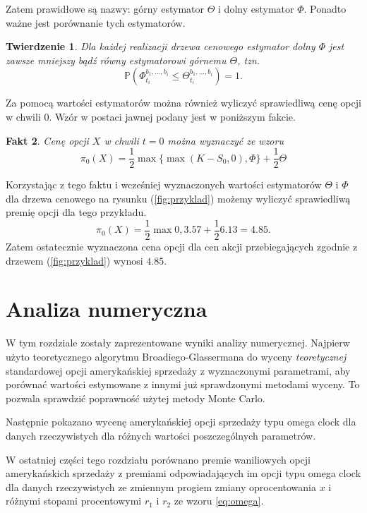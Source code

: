 \documentclass[]{pwr_wmat_praca_dyplomowa}
\theoremstyle{plain}
\newtheorem{theorem}{Twierdzenie}
\numberwithin{theorem}{chapter}
\newtheorem{fact}[theorem]{Fakt}
\theoremstyle{definition}
\numberwithin{theorem}{chapter}
\begin{document}
\noindent Zatem prawidłowe są nazwy: górny estymator $\Theta$ i dolny estymator $\Phi$. Ponadto ważne jest porównanie tych estymatorów.
\begin{theorem}
Dla każdej realizacji drzewa cenowego estymator dolny $\Phi$ jest zawsze mniejszy bądź równy estymatorowi górnemu $\Theta$, tzn.
\begin{equation*}
\mathbb{P}(\Phi_{t_i}^{b_1,\ldots,b_i}\leq \Theta_{t_i}^{b_1,\ldots,b_i}) = 1.
\end{equation*}
\end{theorem} 

\noindent Za pomocą wartości estymatorów można również wyliczyć sprawiedliwą cenę opcji w chwili $0$. Wzór w postaci jawnej podany jest w poniższym fakcie.
\begin{fact}
\label{fact}
Cenę opcji $X$ w chwili $t=0$ można wyznaczyć ze wzoru
\begin{equation*}
\pi_0(X) = \frac{1}{2}\max\{\max(K-S_0,0),\Phi\} + \frac{1}{2}\Theta
\end{equation*}
\end{fact}

\noindent Korzystając z tego faktu i wcześniej wyznaczonych wartości estymatorów $\Theta$ i $\Phi$ dla drzewa cenowego na rysunku (\ref{fig:przyklad}) możemy wyliczyć sprawiedliwą premię opcji dla tego przykładu.
\begin{equation*}
\pi_0(X) = \frac{1}{2}\max{0,3.57}+\frac{1}{2} 6.13 = 4.85.
\end{equation*}
Zatem ostatecznie wyznaczona cena opcji dla cen akcji przebiegających zgodnie z drzewem (\ref{fig:przyklad}) wynosi $4.85.$
\chapter{Analiza numeryczna}

W tym rozdziale zostały zaprezentowane wyniki analizy numerycznej. Najpierw użyto teoretycznego algorytmu Broadiego-Glassermana do wyceny \textit{teoretycznej} standardowej opcji amerykańskiej sprzedaży z wyznaczonymi parametrami, aby porównać wartości estymowane z innymi już sprawdzonymi metodami wyceny. To pozwala sprawdzić poprawność użytej metody Monte Carlo.

Następnie pokazano wycenę amerykańskiej opcji sprzedaży typu omega clock dla danych rzeczywistych dla różnych wartości poszczególnych parametrów.

W ostatniej części tego rozdziału porównano premie waniliowych opcji amerykańskich sprzedaży z premiami odpowiadających im opcji typu omega clock dla danych rzeczywistych ze zmiennym progiem zmiany oprocentowania $x$ i różnymi stopami procentowymi $r_1$ i $r_2$ ze wzoru \ref{eq:omega}. 
\end{document}
